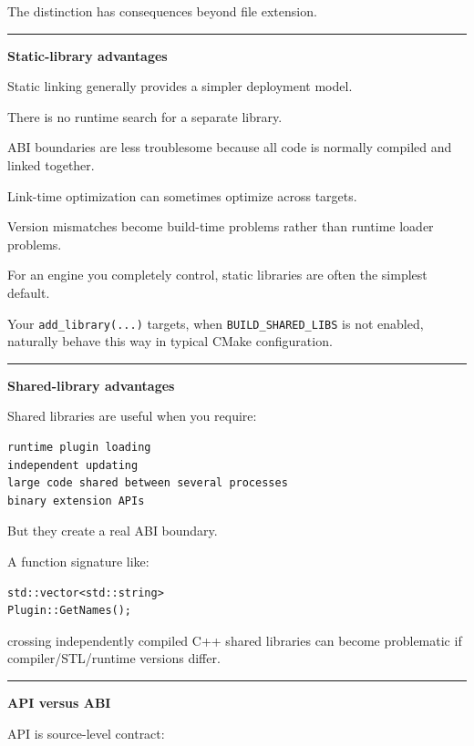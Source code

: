The distinction has consequences beyond file extension.

\begin{center}\rule{0.5\linewidth}{0.5pt}\end{center}

\textbf{Static-library advantages}

Static linking generally provides a simpler deployment model.

There is no runtime search for a separate library.

ABI boundaries are less troublesome because all code is normally compiled and linked together.

Link-time optimization can sometimes optimize across targets.

Version mismatches become build-time problems rather than runtime loader problems.

For an engine you completely control, static libraries are often the simplest default.

Your \texttt{add\_library(...)} targets, when \texttt{BUILD\_SHARED\_LIBS} is not enabled, naturally behave this way in typical CMake configuration.

\begin{center}\rule{0.5\linewidth}{0.5pt}\end{center}

\textbf{Shared-library advantages}

Shared libraries are useful when you require:

\begin{verbatim}
runtime plugin loading
independent updating
large code shared between several processes
binary extension APIs
\end{verbatim}

But they create a real ABI boundary.

A function signature like:

\begin{verbatim}
std::vector<std::string>
Plugin::GetNames();
\end{verbatim}

crossing independently compiled C++ shared libraries can become problematic if compiler/STL/runtime versions differ.

\begin{center}\rule{0.5\linewidth}{0.5pt}\end{center}

\textbf{API versus ABI}

API is source-level contract:

